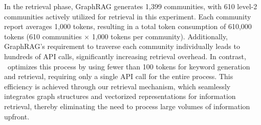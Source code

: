 In the retrieval phase, GraphRAG generates 1,399 communities, with 610 level-2 communities actively utilized for retrieval in this experiment. Each community report averages 1,000 tokens, resulting in a total token consumption of 610,000 tokens (610 communities $\times$ 1,000 tokens per community). Additionally, GraphRAG's requirement to traverse each community individually leads to hundreds of API calls, significantly increasing retrieval overhead. In contrast, \model\ optimizes this process by using fewer than 100 tokens for keyword generation and retrieval, requiring only a single API call for the entire process. This efficiency is achieved through our retrieval mechanism, which seamlessly integrates graph structures and vectorized representations for information retrieval, thereby eliminating the need to process large volumes of information upfront.

